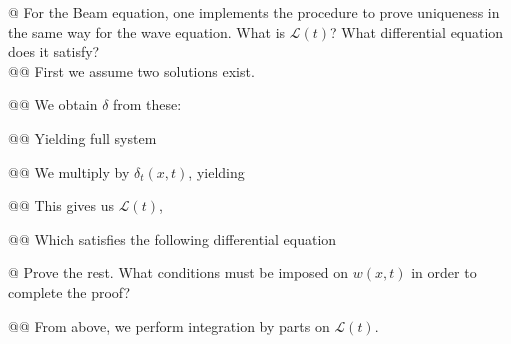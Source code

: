 \documentclass[10pt]{article}
\begin{document}
\begin{easylist}[enumerate]
    @ For the Beam equation, one implements the procedure to prove uniqueness in the same way for the wave equation.
    What is $\mathcal{L}(t)$? What differential equation does it satisfy?\\

    @@ First we assume two solutions exist.

    @@ We obtain $\delta$ from these:


    @@ Yielding full system


    @@ We multiply by $\delta_t(x, t)$, yielding


    @@ This gives us $\mathcal{L}(t)$,


    @@ Which satisfies the following differential equation


    @ Prove the rest. What conditions must be imposed on $w(x, t)$ in order to complete the proof?

    @@ From above, we perform integration by parts on $\mathcal{L}(t)$.\\



\end{easylist}
\end{document}
